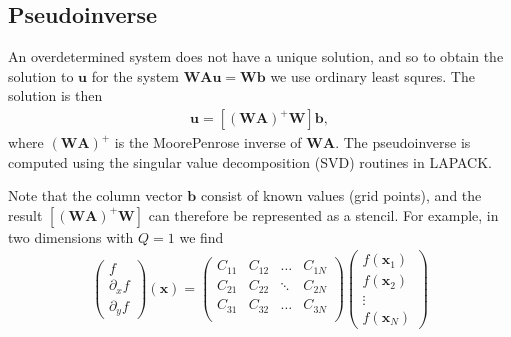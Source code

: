 \documentclass[letterpaper,10pt,english]{sphinxmanual}
\begin{document}
\subsection{Pseudo\sphinxhyphen{}inverse}
\label{\detokenize{Utilities/LeastSquares:pseudo-inverse}}
An over\sphinxhyphen{}determined system does not have a unique solution, and so to obtain the solution to \(\mathbf{u}\) for the system \(\mathbf{W}\mathbf{A}\mathbf{u} = \mathbf{W}\mathbf{b}\) we use ordinary least squres.
The solution is then
\begin{equation*}
\begin{split}\mathbf{u} = \left[\left(\mathbf{W}\mathbf{A}\right)^+ \mathbf{W}\right]\mathbf{b},\end{split}
\end{equation*}
where \(\left(\mathbf{W}\mathbf{A}\right)^+\) is the Moore\sphinxhyphen{}Penrose inverse of \(\mathbf{W}\mathbf{A}\).
The pseudo\sphinxhyphen{}inverse is computed using the singular value decomposition (SVD) routines in LAPACK.

Note that the column vector \(\mathbf{b}\) consist of known values (grid points), and the result \(\left[\left(\mathbf{W}\mathbf{A}\right)^+ \mathbf{W}\right]\) can therefore be represented as a stencil.
For example, in two dimensions with \(Q = 1\) we find
\begin{equation*}
\begin{split}\begin{pmatrix}
f            \\
\partial_x f \\
\partial_y f
\end{pmatrix}(\mathbf{x})
=
\begin{pmatrix}
C_{11} & C_{12} & \ldots & C_{1N} \\
C_{21} & C_{22} & \ddots & C_{2N} \\
C_{31} & C_{32} & \ldots & C_{3N} \\
\end{pmatrix}
\begin{pmatrix}
f(\mathbf{x}_1) \\
f(\mathbf{x}_2) \\
\vdots \\
f(\mathbf{x}_N)
\end{pmatrix}\end{split}
\end{equation*}
\end{document}
